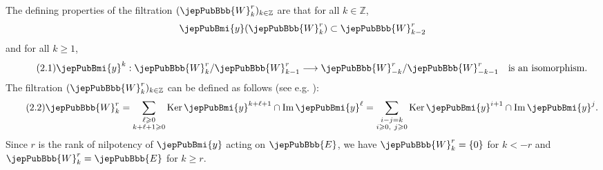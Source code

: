 The defining properties of the filtration $(\jepPubBbb{W}^r_k)_{k\in\mathbb Z}$ are that for all $k\in\mathbb Z$,
\[
\jepPubBmi{y}(\jepPubBbb{W}^r_k)\subset\jepPubBbb{W}^r_{k-2}
\]
and for all $k\geqslant1$,
\begin{equation}\tag{2.1}
\jepPubBmi{y}^k:\jepPubBbb{W}^r_k/\jepPubBbb{W}^r_{k-1}\longrightarrow\jepPubBbb{W}^r_{-k}/\jepPubBbb{W}^r_{-k-1}\quad\text{is an isomorphism.}
\end{equation}
The filtration $(\jepPubBbb{W}^r_k)_{k\in\mathbb Z}$ can be defined as follows (see e.g. \cite{jep93SZ85}):
\begin{equation}\tag{2.2}
\jepPubBbb{W}^r_k=\sum_{\substack{\ell\geqslant0\\k+\ell+1\geqslant0}}\operatorname{Ker}\jepPubBmi{y}^{k+\ell+1}\cap\operatorname{Im}\jepPubBmi{y}^{\ell}=\sum_{\substack{i-j=k\\i\geqslant0,\ j\geqslant0}}\operatorname{Ker}\jepPubBmi{y}^{i+1}\cap\operatorname{Im}\jepPubBmi{y}^{j}.
\end{equation}
Since $r$ is the rank of nilpotency of $\jepPubBmi{y}$ acting on $\jepPubBbb{E}$, we have $\jepPubBbb{W}^r_k=\{0\}$ for $k<-r$ and $\jepPubBbb{W}^r_k=\jepPubBbb{E}$ for $k\geqslant r$.

